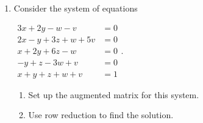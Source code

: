 \begin{enumerate}
\item Consider the system of equations 

$\begin{matrix}
3x+2y-w-v&=0\\2x-y+3z+w+5v&=0\\x+2y+6z-w&=0\\ -y+z-3w+v&=0\\x+y+z+w+v&=1
\end{matrix}$.
\begin{enumerate}
\item Set up the augmented matrix for this system.
\item Use row reduction to find the solution.
\vspace{.1in}
\end{enumerate}


\end{enumerate}







 
